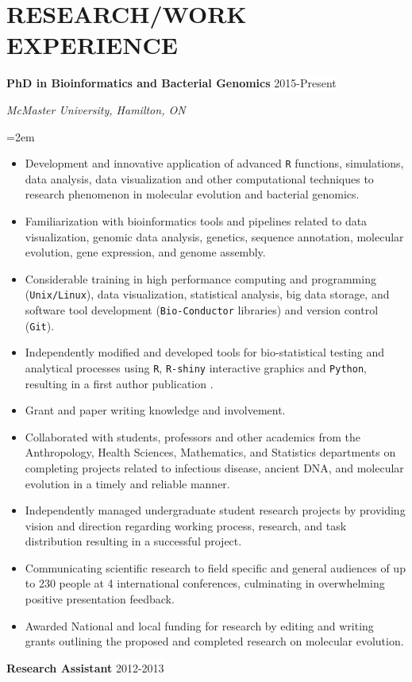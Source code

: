 \documentclass[paper=a4,fontsize=11pt]{scrartcl}	 			%
\newcommand{\NewPart}[1]{\section*{\uppercase{#1}}}
\newcommand{\EducationEntry}[4]{
		\noindent \textbf{#1} \hfill 					%
		\colorbox{White}{%
			\parbox{10em}{%
			\hfill\color{Black}#2}} \par				%
		\noindent \textit{#3} \par					%
		\noindent\hangindent=2em\hangafter=0 \small #4 	%
		\normalsize \par}
\newcommand{\WorkEntry}[4]{						%
		\noindent \textbf{#1} \hfill 					%
		\colorbox{White}{\color{Black}#2} \par		%
		\noindent \textit{#3} \par					%
		\noindent\hangindent=2em\hangafter=0 \small #4 	%
		\normalsize \par}
\newcommand{\WorkEntryD}[3]{						%
	\indent \textbf{#1} \hfill 					%
	\colorbox{White}{\color{Black}#2} \par		%
	\hangindent=2em\hangafter=0 \small  #3 \par
    \normalsize }
\newcommand{\WorkEntryF}[2]{						%
	 \textbf{#1} \hfill 					%
	\colorbox{White}{\color{Black}#2} \par}
\begin{document}
\NewPart{Research/Work Experience}{}
\WorkEntry{PhD in Bioinformatics and Bacterial Genomics}{2015-Present}{McMaster University, Hamilton, ON}{
	\begin{itemize}
		\item Development and innovative application of advanced \texttt{R} functions, simulations, data analysis, data visualization and other computational techniques to research phenomenon in molecular evolution and bacterial genomics.
		\item Familiarization with bioinformatics tools and pipelines related to data visualization, genomic data analysis, genetics, sequence annotation, molecular evolution, gene expression, and genome assembly.
		\item Considerable training in high performance computing and programming (\texttt{Unix/Linux}), data visualization, statistical analysis, big data storage, and software tool development (\texttt{Bio-Conductor} libraries) and version control (\texttt{Git}).
		\item Independently modified and developed tools for bio-statistical testing and analytical processes using \texttt{R}, \texttt{R-shiny} interactive graphics and \texttt{Python}, resulting in a first author publication \cite{Lato:20}.
		\item Grant and paper writing knowledge and involvement.
		\item Collaborated with students, professors and other academics from the Anthropology, Health Sciences, Mathematics, and Statistics departments on completing projects related to infectious disease, ancient DNA, and molecular evolution in a timely and reliable manner. 
		\item Independently managed undergraduate student research projects by providing vision and direction regarding working process, research, and task distribution resulting in a successful project.
		\item Communicating scientific research to field specific and general audiences of up to 230 people at 4 international conferences, culminating in overwhelming positive presentation feedback.
		\item Awarded National and local funding for research by editing and writing grants outlining the proposed and completed research on molecular evolution.
\end{itemize}}
\WorkEntryF{Research Assistant}{2012-2013}
\end{document}
